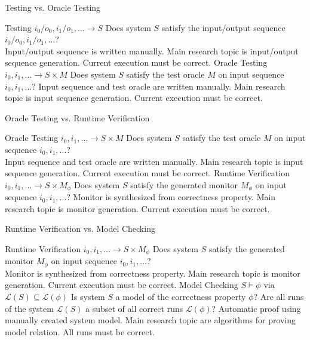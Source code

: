 \begin{Frame}{Testing vs. Oracle Testing}
\begin{center}
  \compare
    {Testing}
    {$i_0/o_0, i_1/o_1, \ldots \to S$}
    {Does system $S$ satisfy the \alert{input/output sequence}
             $i_0/o_0, i_1/o_1, \ldots$?\\}
    {Input/output sequence is written \alert{manually}.}
    {Main research topic is \alert{input/output sequence generation}.}
    {\alert{Current execution} must be correct.}
    {Oracle Testing}
    {$i_0, i_1, \ldots \to S \times M$}
    {Does system $S$ satisfy the \alert{test oracle} $M$ on input sequence
             $i_0, i_1, \ldots$?}
    {Input sequence and test oracle are written \alert{manually}.}
    {Main research topic is \alert{input sequence generation}.}
    {\alert{Current execution} must be correct.}

\end{center}
\end{Frame}

\begin{Frame}{Oracle Testing vs. Runtime Verification}
\begin{center}
  \compare
    {Oracle Testing}
    {$i_0, i_1, \ldots \to S \times M$}
    {Does system $S$ satisfy the \alert{test oracle} $M$ on input sequence
             $i_0, i_1, \ldots$?\\}
    {Input sequence and test oracle are written \alert{manually}.}
    {Main research topic is \alert{input sequence generation}.}
    {\alert{Current execution} must be correct.}
    {Runtime Verification}
    {$i_0,i_1,\ldots \to S \times M_\phi$}
    {Does system $S$ satisfy the \alert{generated monitor}
      $M_\phi$ on input sequence $i_0, i_1, \ldots$?}
    {Monitor is \alert{synthesized} from correctness property.}
    {Main research topic is \alert{monitor generation}.}
    {\alert{Current execution} must be correct.}
\end{center}
\end{Frame}

\begin{Frame}{Runtime Verification vs. Model Checking}
\begin{center}
  \compare
    {Runtime Verification}
    {$i_0,i_1,\ldots \to S \times M_\phi$}
    {Does system $S$ satisfy the \alert{generated monitor}
      $M_\phi$ on input sequence $i_0, i_1, \ldots$?\\}
    {Monitor is \alert{synthesized} from correctness property.}
    {Main research topic is \alert{monitor generation}.}
    {\alert{Current execution} must be correct.}
    {Model Checking}
    {$S \models \phi$ via $\mathcal L(S) \subseteq \mathcal L(\phi)$}
    {Is system $S$ a \alert{model of the correctness property} $\phi$?
         Are all runs of the system $\mathcal L(S)$ a subset of all
         correct runs $\mathcal L(\phi)$?}
    {\alert{Automatic proof} using manually created system model.}
    {Main research topic are \alert{algorithms for proving model relation}.}
    {\alert{All runs} must be correct.}
\end{center}
\end{Frame}

